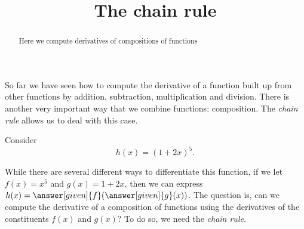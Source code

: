 \documentclass{ximera}
\title[Dig-In:]{The chain rule}
\begin{document}
\begin{abstract}
Here we compute derivatives of compositions of functions
\end{abstract}
\maketitle


So far we have seen how to compute the derivative of a function built
up from other functions by addition, subtraction, multiplication and
division. There is another very important way that we combine
functions: composition. The \textit{chain rule} allows us to deal with
this case.


Consider
\[
h(x) = (1+2x)^5.
\] 

While there are several different ways to differentiate this function,
if we let $f(x) = x^5$ and $g(x) = 1+2x$, then we can express $h(x) =
\answer[given]{f}(\answer[given]{g}(x))$. The question is, can we compute the derivative of a
composition of functions using the derivatives of the constituents
$f(x)$ and $g(x)$? To do so, we need the \textit{chain rule}.
\end{document}

